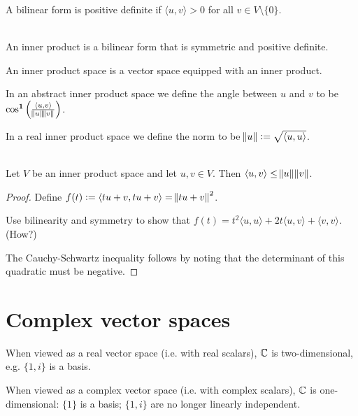 \begin{definition*}
  A  bilinear form is positive definite if $\langle u, v \rangle > 0$ for all
  $v \in V \setminus \{0\}$. 
\end{definition*}

\begin{definition*}~\\
  An inner product is a bilinear form that is symmetric and positive definite.

  An inner product space is a vector space equipped with an inner product.

  In an abstract inner product space we define the angle between $u$ and $v$ to be
  $\cos^{\mathbf 1}\Big(\frac{\langle u, v \rangle}{\norm{u}\norm{v}}\Big)$.

  In a real inner product space we define the norm to be $\norm{u} := \sqrt{\langle u, u \rangle}$.
\end{definition*}

\begin{theorem*}~\\
  Let $V$ be an inner product space and let $u, v \in V$. Then
  $\langle u, v \rangle \leq \norm{u} \norm{v}$.
\end{theorem*}

\begin{proof}
  Define $f(t) := \langle tu + v, tu + v \rangle = \norm{tu +v}^2$.

  Use bilinearity and symmetry to show that
  $f(t) = t^2 \langle u, u \rangle + 2t \langle u, v \rangle + \langle v, v \rangle$. (How?)

  The Cauchy-Schwartz inequality follows by noting that the determinant of this quadratic must be
  negative.
\end{proof}

\section{Complex vector spaces}
When viewed as a real vector space (i.e. with real scalars), $\mathbb{C}$ is
two-dimensional, e.g. $\{1, i\}$ is a basis.

When viewed as a complex vector space (i.e. with complex scalars), $\mathbb{C}$ is one-dimensional: $\{1\}$
is a basis; $\{1, i\}$ are no longer linearly independent.


